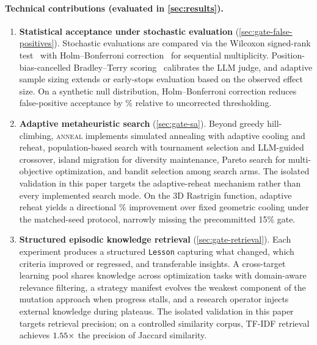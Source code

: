\paragraph{Technical contributions (evaluated in \cref{sec:results}).}

\begin{enumerate}
  \item \textbf{Statistical acceptance under stochastic evaluation} (\cref{sec:gate-false-positives}).
    Stochastic evaluations are compared via the Wilcoxon signed-rank test~\cite{wilcoxon1945individual} with Holm--Bonferroni correction~\cite{holm1979simple} for sequential multiplicity.
    Position-bias-cancelled Bradley--Terry scoring~\cite{bradley1952rank} calibrates the LLM judge, and adaptive sample sizing extends or early-stops evaluation based on the observed effect size.
    On a synthetic null distribution, Holm--Bonferroni correction reduces false-positive acceptance by \fpReductionPct\% relative to uncorrected thresholding.

  \item \textbf{Adaptive metaheuristic search} (\cref{sec:gate-sa}).
    Beyond greedy hill-climbing, \textsc{anneal} implements simulated annealing with adaptive cooling and reheat, population-based search with tournament selection and LLM-guided crossover, island migration for diversity maintenance, Pareto search for multi-objective optimization, and bandit selection among search arms.
    The isolated validation in this paper targets the adaptive-reheat mechanism rather than every implemented search mode.
    On the 3D Rastrigin function, adaptive reheat yields a directional \saImprovementPct\% improvement over fixed geometric cooling under the matched-seed protocol, narrowly missing the precommitted 15\% gate.

  \item \textbf{Structured episodic knowledge retrieval} (\cref{sec:gate-retrieval}).
    Each experiment produces a structured \texttt{Lesson} capturing what changed, which criteria improved or regressed, and transferable insights.
    A cross-target learning pool shares knowledge across optimization tasks with domain-aware relevance filtering, a strategy manifest evolves the weakest component of the mutation approach when progress stalls, and a research operator injects external knowledge during plateaus.
    The isolated validation in this paper targets retrieval precision; on a controlled similarity corpus, TF-IDF retrieval achieves $1.55\times$ the precision of Jaccard similarity.
\end{enumerate}

